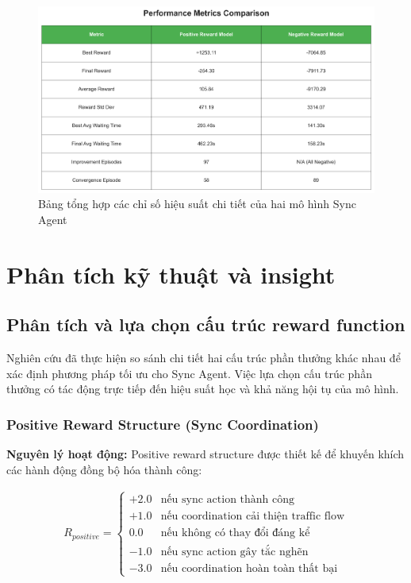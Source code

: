 \begin{figure}[!htp]
    \centering
    \includegraphics[width=\textwidth]{figures/sync_performance_metrics.png}
    \caption{Bảng tổng hợp các chỉ số hiệu suất chi tiết của hai mô hình Sync Agent}
    \label{fig:sync_performance_metrics}
\end{figure}

\section{Phân tích kỹ thuật và insight}

\subsection{Phân tích và lựa chọn cấu trúc reward function}

Nghiên cứu đã thực hiện so sánh chi tiết hai cấu trúc phần thưởng khác nhau
để xác định phương pháp tối ưu cho Sync Agent. Việc lựa chọn cấu trúc phần thưởng có
tác động trực tiếp đến hiệu suất học và khả năng hội tụ của mô hình.

\subsubsection{Positive Reward Structure (Sync Coordination)}

\textbf{Nguyên lý hoạt động:} Positive reward structure được thiết kế để khuyến khích
các hành động đồng bộ hóa thành công:

\begin{align}
    R_{positive}= \begin{cases}+2.0&\text{nếu sync action thành công}\\ +1.0&\text{nếu coordination cải thiện traffic flow}\\ 0.0&\text{nếu không có thay đổi đáng kể}\\ -1.0&\text{nếu sync action gây tắc nghẽn}\\ -3.0&\text{nếu coordination hoàn toàn thất bại}\end{cases}
\end{align}

